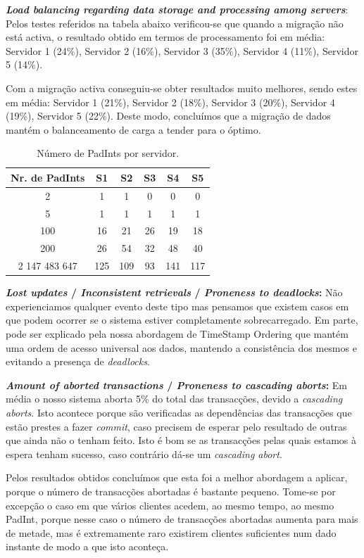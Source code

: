 \begin{description}
\item{\textbf{\textit{Load balancing regarding data storage and processing among servers}}:}
Pelos testes referidos na tabela abaixo verificou-se que quando a migração não está activa, o resultado obtido em termos de processamento foi em média: Servidor 1 (24\%), Servidor 2 (16\%), Servidor 3 (35\%), Servidor 4 (11\%), Servidor 5 (14\%). 

Com a migração activa conseguiu-se obter resultados muito melhores, sendo estes em média: Servidor 1 (21\%), Servidor 2 (18\%), Servidor 3 (20\%), Servidor 4 (19\%), Servidor 5 (22\%). Deste modo, concluímos que a migração de dados mantém o balanceamento de carga a tender para o óptimo. 

\begin{table}[htb]
\centering
\begin{tabular}{c|c|c|c|c|c}
\textbf{Nr. de PadInts} &  \textbf{S1} &  \textbf{S2} & \textbf{S3} & \textbf{S4} & \textbf{S5} \\\hline
2 & 1 & 1 & 0 & 0 & 0\\
5 & 1 & 1 & 1 & 1 & 1\\
100 & 16 & 21 & 26 & 19 & 18\\
200 & 26 & 54 & 32 & 48 & 40\\
2 147 483 647 & 125 & 109 & 93 & 141 & 117\\
\end{tabular}
\caption{\label{tab:balanceamento}Número de PadInts por servidor.}
\end{table}

\item{\textbf{\textit{Lost updates} / \textit{Inconsistent retrievals} / \textit{Proneness to deadlocks}:}} 
Não experienciamos qualquer evento deste tipo mas pensamos que existem casos em que podem ocorrer se o sistema estiver completamente sobrecarregado. Em parte, pode ser explicado pela nossa abordagem de TimeStamp Ordering\cite{ex1} que mantém uma ordem de acesso universal aos dados, mantendo a consistência dos mesmos e evitando a presença de \textit{deadlocks}.

\item{\textbf{\textit{Amount of aborted transactions} / \textit{Proneness to cascading aborts}:}} 
Em média o nosso sistema aborta 5\% do total das transacções, devido a \textit{cascading aborts}. Isto acontece porque são verificadas as dependências das transacções que estão prestes a fazer \textit{commit}, caso precisem de esperar pelo resultado de outras que ainda não o tenham feito. Isto é bom se as transacções pelas quais estamos à espera tenham sucesso, caso contrário dá-se um \textit{cascading abort}. 

Pelos resultados obtidos concluímos que esta foi a melhor abordagem a aplicar, porque o número de transacções abortadas é bastante pequeno. Tome-se por excepção o caso em que vários clientes acedem, ao mesmo tempo, ao mesmo PadInt, porque nesse caso o número de transacções abortadas aumenta para mais de metade, mas é extremamente raro existirem clientes suficientes num dado instante de modo a que isto aconteça.

\end{description}